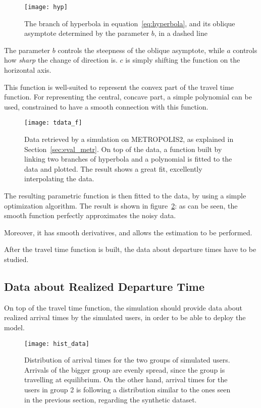 \begin{figure}
  \centering
  \texttt{[image: hyp]}
  \caption{The branch of hyperbola in equation~\eqref{eq:hyperbola},
  and its oblique asymptote determined by the parameter \(b\), in a dashed line}
  \label{fig:hyp}
\end{figure}

The parameter \(b\) controls the steepness of the oblique asymptote,
while \(a\) controls how \textit{sharp} the change of direction is.
\(c\) is simply shifting the function on the horizontal axis.

This function is well-suited to represent the convex part of the travel time function.
For representing the central, concave part, a simple polynomial can be used,
constrained to have a smooth connection with this function.

\begin{figure}
  \centering
  \texttt{[image: tdata\_f]}
  \caption{Data retrieved by a simulation on METROPOLIS2, as explained in Section~\ref{sec:eval_metr}.
    On top of the data, a function built by linking two branches of hyperbola and a polynomial is fitted to the data and plotted.
  The result shows a great fit, excellently interpolating the data.}
  \label{fig:func_on_data}
\end{figure}

The resulting parametric function is then fitted to the data,
by using a simple optimization algorithm.
The result is shown in figure~\ref{fig:func_on_data}:
as can be seen, the smooth function perfectly approximates the noisy data.

Moreover, it has smooth derivatives, and allows the estimation to be performed.

After the travel time function is built, the data about departure times have to be studied.

\subsection{Data about Realized Departure Time}
\label{sec:data-about-realized}

On top of the travel time function,
the simulation should provide data about realized arrival times by the simulated users,
in order to be able to deploy the model.

\begin{figure}
  \centering
  \texttt{[image: hist\_data]}
  \caption{Distribution of arrival times for the two groups of simulated users.
    Arrivals of the bigger group are evenly spread, since the group is travelling at equilibrium.
  On the other hand, arrival times for the users in group 2 is following a distribution similar to the ones seen in the previous section, regarding the synthetic dataset.}
  \label{fig:hist_data}
\end{figure}

